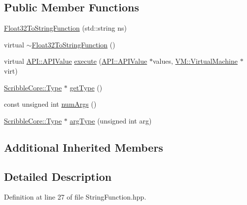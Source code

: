 \subsection*{Public Member Functions}
\begin{DoxyCompactItemize}
\item 
\hyperlink{class_float32_to_string_function_a9286b5a1c7e0c7cafcb73fdd7baf8983}{Float32\-To\-String\-Function} (std\-::string ns)
\item 
virtual \hyperlink{class_float32_to_string_function_aa8984d8353e113c8ffb63803ca0e2644}{$\sim$\-Float32\-To\-String\-Function} ()
\item 
virtual \hyperlink{class_a_p_i_1_1_a_p_i_value}{A\-P\-I\-::\-A\-P\-I\-Value} \hyperlink{class_float32_to_string_function_a37af0d9a46e186a0ae48a589123fb433}{execute} (\hyperlink{class_a_p_i_1_1_a_p_i_value}{A\-P\-I\-::\-A\-P\-I\-Value} $\ast$values, \hyperlink{class_v_m_1_1_virtual_machine}{V\-M\-::\-Virtual\-Machine} $\ast$virt)
\item 
\hyperlink{class_scribble_core_1_1_type}{Scribble\-Core\-::\-Type} $\ast$ \hyperlink{class_float32_to_string_function_ab4e27658631aa87aee707ac75fcdf2a1}{get\-Type} ()
\item 
const unsigned int \hyperlink{class_float32_to_string_function_a9eca24c6058235a540588ee7b1189c6a}{num\-Args} ()
\item 
\hyperlink{class_scribble_core_1_1_type}{Scribble\-Core\-::\-Type} $\ast$ \hyperlink{class_float32_to_string_function_a55ae35ad951c4e85a5c41f92041e8ef4}{arg\-Type} (unsigned int arg)
\end{DoxyCompactItemize}
\subsection*{Additional Inherited Members}


\subsection{Detailed Description}


Definition at line 27 of file String\-Function.\-hpp.



